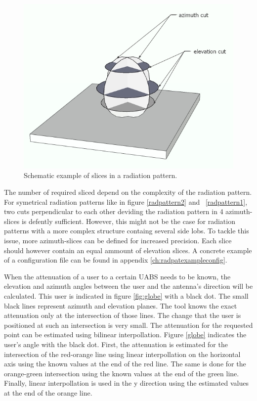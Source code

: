 \begin{figure}[H]
  \includegraphics[width=\textwidth]{../images/3Dimages/slicesOfPattern.jpg}
  \caption{Schematic example of slices in a radiation pattern.}
  \label{fig:slicesOfPattern}
\end{figure}

The number of required sliced depend on the complexity of the radiation pattern. For symetrical radiation patterns like 
in figure \ref{radpattern2} and  \ref{radpattern1}, two cuts perpendicular to each other deviding the radiation pattern in 4 azimuth-slices 
is defently sufficient. However, this might not be the case for radiation patterns with a more complex structure containg several  
side lobs. To tackle this issue, more azimuth-slices can be defined for increased precision. Each slice should however contain an equal ammount 
of elevation slices.  A concrete example of a configuration file can be found in appendix \ref{ch:radpatexampleconfig}.

When the attenuation of a user to a certain \gls{UABS} needs to be known, the elevation and azimuth angles between the user and the antenna's direction 
will be calculated. This user is indicated in figure \ref{fig:globe} with a black dot. The small black lines represent azimuth and elevation planes. 
The tool knows the exact attenuation only at the intersection of those lines. 
The change that the user is positioned at such an intersection is very small. The attenuation for the requested point can be estimated using bilinear interpollation.
Figure \ref{globe} indicates the user's angle with the black dot. 
First, the attenuation is estimated for the intersection of the red-orange line using linear interpollation on the horizontal axis using the known values
 at the end of the red line. The same is done for the orange-green intersection using the known values at the end of the green line. Finally, linear interpollation is used in the y direction using the estimated values at the end of 
the orange line.

